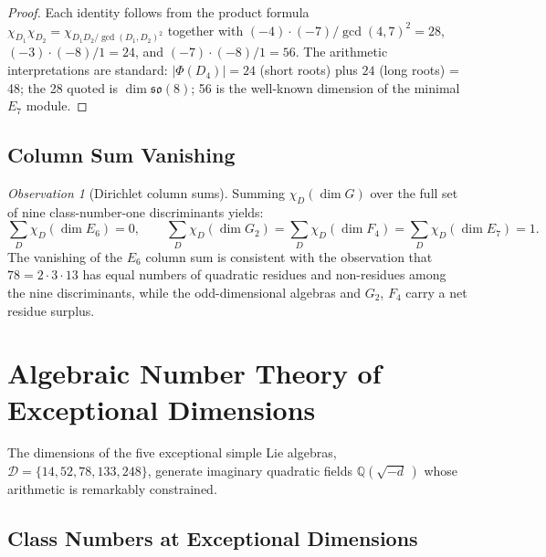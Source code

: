 \documentclass[11pt]{amsart}
\theoremstyle{plain}
\theoremstyle{definition}
\theoremstyle{remark}
\newtheorem{observation}[theorem]{Observation}
\renewcommand{\Phi}{\varPhi}
\begin{document}
\begin{proof}
Each identity follows from the product formula
$\chi_{D_1}\chi_{D_2} = \chi_{D_1 D_2/\gcd(D_1,D_2)^2}$ together with
$(-4)\cdot(-7)/\gcd(4,7)^2 = 28$, $(-3)\cdot(-8)/1 = 24$,
and $(-7)\cdot(-8)/1 = 56$.
The arithmetic interpretations are standard: $|\Phi(D_4)|=24$ (short roots)
plus $24$ (long roots) = 48; the 28 quoted is $\dim\mathfrak{so}(8)$;
56 is the well-known dimension of the minimal $E_7$ module.
\end{proof}

\subsection{Column Sum Vanishing}\label{subsec:col-sum}

\begin{observation}[Dirichlet column sums]
\label{obs:col-sum}
Summing $\chi_D(\dim G)$ over the full set of nine class-number-one
discriminants yields:
\begin{equation}
\sum_{D} \chi_D(\dim E_6) = 0,
\qquad
\sum_{D} \chi_D(\dim G_2)
  = \sum_{D} \chi_D(\dim F_4)
  = \sum_{D} \chi_D(\dim E_7) = 1.
\end{equation}
The vanishing of the $E_6$ column sum is consistent with the observation
that $78 = 2 \cdot 3 \cdot 13$ has equal numbers of quadratic residues and
non-residues among the nine discriminants, while the odd-dimensional algebras
and $G_2$, $F_4$ carry a net residue surplus.
\end{observation}


\section{Algebraic Number Theory of Exceptional Dimensions}%
\label{sec:ant-exceptional}

The dimensions of the five exceptional simple Lie algebras,
$\mathcal{D} = \{14, 52, 78, 133, 248\}$, generate imaginary quadratic
fields $\mathbb{Q}(\!\sqrt{-d}\,)$ whose arithmetic is remarkably
constrained.

\subsection{Class Numbers at Exceptional Dimensions}%
\label{subsec:class-numbers}
\end{document}
